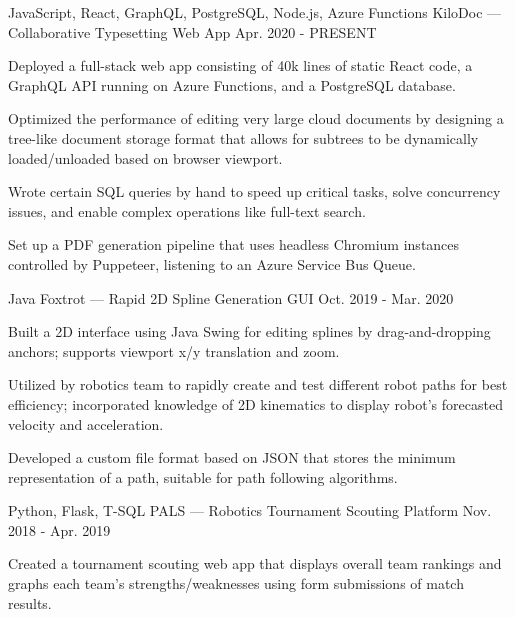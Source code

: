 
\begin{cventries}
  \cventry
  {JavaScript, React, GraphQL, PostgreSQL, Node.js, Azure Functions} %
  {KiloDoc --- Collaborative Typesetting Web App} %
  {} %
  {Apr. 2020 - PRESENT} %
  {
    \begin{cvitems} %
      \item {Deployed a full-stack web app consisting of 40k lines of static React code, a GraphQL API running on Azure Functions, and a PostgreSQL database.}
      \item {Optimized the performance of editing very large cloud documents by designing a tree-like document storage format that allows for subtrees to be dynamically loaded/unloaded based on browser viewport.}
      \item {Wrote certain SQL queries by hand to speed up critical tasks, solve concurrency issues, and enable complex operations like full-text search.}
      \item {Set up a PDF generation pipeline that uses headless Chromium instances controlled by Puppeteer, listening to an Azure Service Bus Queue.}
    \end{cvitems}
  }

  \cventry
  {Java} %
  {Foxtrot --- Rapid 2D Spline Generation GUI} %
  {} %
  {Oct. 2019 - Mar. 2020} %
  {
    \begin{cvitems} %
      \item {Built a 2D interface using Java Swing for editing splines by drag-and-dropping anchors; supports viewport x/y translation and zoom.}
      \item {Utilized by robotics team to rapidly create and test different robot paths for best efficiency; incorporated knowledge of 2D kinematics to display robot's forecasted velocity and acceleration.}
      \item {Developed a custom file format based on JSON that stores the minimum representation of a path, suitable for path following algorithms.}
    \end{cvitems}
  }

  \cventry
  {Python, Flask, T-SQL} %
  {PALS --- Robotics Tournament Scouting Platform} %
  {} %
  {Nov. 2018 - Apr. 2019} %
  {
    \begin{cvitems} %
      \item {Created a tournament scouting web app that displays overall team rankings and graphs each team's strengths/weaknesses using form submissions of match results.}
    \end{cvitems}
  }
\end{cventries}
